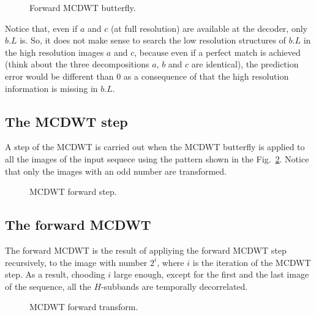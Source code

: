 \begin{figure}
  \centering %
  \caption{Forward MCDWT butterfly.}
  \label{fig:forward_butterfly}
\end{figure}



Notice that, even if $a$ and $c$ (at full resolution) are available at
the decoder, only $b.L$ is. So, it does not make sense to search the
low resolution structures of $b.L$ in the high resolution images $a$
and $c$, because even if a perfect match is achieved (think about the
three decompositions $a$, $b$ and $c$ are identical), the prediction error
would be different than $0$ as a consequence of that the high
resolution information is missing in $b.L$.

\subsection{The MCDWT step}
A step of the MCDWT is carried out when the MCDWT butterfly is applied
to all the images of the input sequece using the pattern shown in the
Fig.~\ref{fig:forward_MCDWT_step}. Notice that only the images with an
odd number are transformed.
\begin{figure}
  \centering
  \caption{MCDWT forward step.}
  \label{fig:forward_MCDWT_step}
\end{figure}

\subsection{The forward MCDWT}
The forward MCDWT is the result of appliying the forward MCDWT step
recursively, to the image with number $2^i$, where $i$ is the
iteration of the MCDWT step. As a result, chooding $i$ large enough,
except for the first and the last image of the sequence, all the
$H$-subbands are temporally decorrelated.

\begin{figure}
  \centering
  \caption{MCDWT forward transform.}
  \label{fig:forward_MCDWT}
\end{figure}

